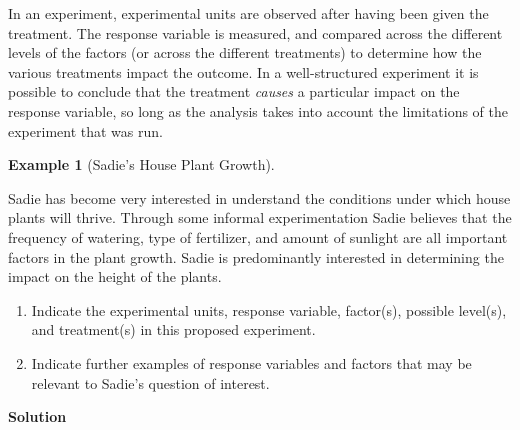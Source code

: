 \documentclass[
  letterpaper,
  DIV=11,
  numbers=noendperiod]{scrreprt}
\providecommand{\tightlist}{%
  \setlength{\itemsep}{0pt}\setlength{\parskip}{0pt}}\usepackage{longtable,booktabs,array}
\theoremstyle{definition}
\theoremstyle{definition}
\newtheorem{example}{Example}[chapter]
\theoremstyle{definition}
\theoremstyle{remark}
\begin{document}
In an experiment, experimental units are observed after having been
given the treatment. The response variable is measured, and compared
across the different levels of the factors (or across the different
treatments) to determine how the various treatments impact the outcome.
In a well-structured experiment it is possible to conclude that the
treatment \emph{causes} a particular impact on the response variable, so
long as the analysis takes into account the limitations of the
experiment that was run.

\begin{example}[Sadie's House Plant
Growth]\protect\hypertarget{exm-treatments}{}\label{exm-treatments}

Sadie has become very interested in understand the conditions under
which house plants will thrive. Through some informal experimentation
Sadie believes that the frequency of watering, type of fertilizer, and
amount of sunlight are all important factors in the plant growth. Sadie
is predominantly interested in determining the impact on the height of
the plants.

\begin{enumerate}
\def\labelenumi{\alph{enumi}.}
\tightlist
\item
  Indicate the experimental units, response variable, factor(s),
  possible level(s), and treatment(s) in this proposed experiment.
\item
  Indicate further examples of response variables and factors that may
  be relevant to Sadie's question of interest.
\end{enumerate}

\begin{tcolorbox}[enhanced jigsaw, colback=white, colframe=quarto-callout-color-frame, arc=.35mm, leftrule=.75mm, rightrule=.15mm, opacityback=0, breakable, bottomrule=.15mm, left=2mm, toprule=.15mm]

\vspace{-3mm}\textbf{Solution}\vspace{3mm}


\end{tcolorbox}
\end{example}
\end{document}

